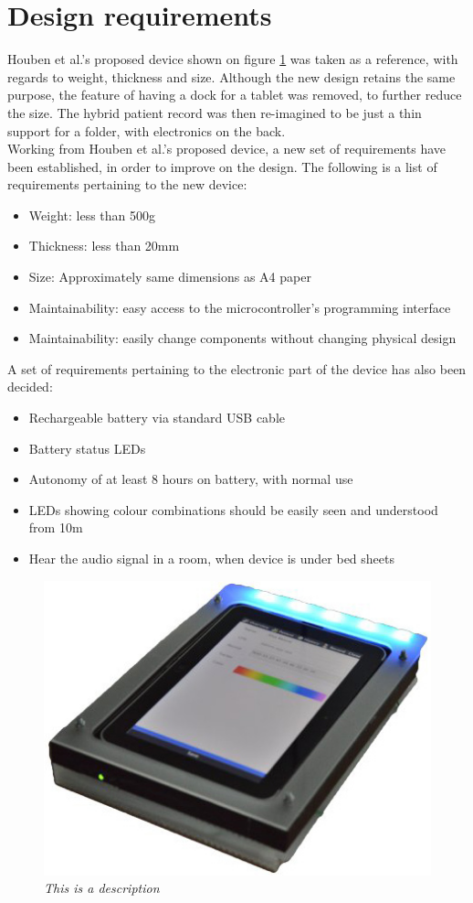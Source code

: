 \section{Design requirements}

Houben et al.'s proposed device shown on figure \ref{fig:old-hypr} was taken as a reference, with regards to weight, thickness and size. Although the new design retains the same purpose, the feature of having a dock for a tablet was removed, to further reduce the size. The hybrid patient record was then re-imagined to be just a thin support for a folder, with electronics on the back. \\

Working from Houben et al.'s proposed device, a new set of requirements have been established, in order to improve on the design. The following is a list of requirements pertaining to the new device:

\begin{itemize} \itemsep0em
	\item Weight: less than 500g
	\item Thickness: less than 20mm
	\item Size: Approximately same dimensions as A4 paper
	\item Maintainability: easy access to the microcontroller's programming interface
	\item Maintainability: easily change components without changing physical design
\end{itemize}

A set of requirements pertaining to the electronic part of the device has also been decided:

\begin{itemize} \itemsep0em
	\item Rechargeable battery via standard USB cable
	\item Battery status LEDs
	\item Autonomy of at least 8 hours on battery, with normal use
	\item LEDs showing colour combinations should be easily seen and understood from 10m 
	\item Hear the audio signal in a room, when device is under bed sheets
\end{itemize}

\begin{figure}[h]
\begin{center}
\includegraphics[scale=.5]{figures/old-hypr.jpg}
\caption{\small {\it {This is a description}}} \label{fig:old-hypr}
\end{center}
\end{figure}